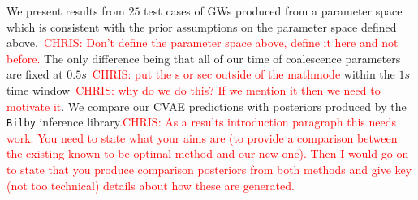 \documentclass[%
showpacs,
 amsmath,amssymb,
 aps,
 twocolumn,
 prl,
 reprint,
floatfix,
]{revtex4-1}
\newcommand{\chris}[1]{\textcolor{red}{CHRIS: #1}}
\begin{document}
%
%
We present results from $25$ test cases of \acp{GW} produced from a parameter space
which is consistent with the prior assumptions on the parameter space defined
above.~\chris{Don't define the parameter space above, define it here and not
before.} The only difference being that all of our time of coalescence
parameters are fixed at $0.5s$~\chris{put the s or sec outside of the mathmode}
within the $1s$ time window~\chris{why do we do this? If we mention it then we
need to motivate it}. We compare our \ac{CVAE} predictions with posteriors
produced by the \texttt{Bilby} inference library.\chris{As a results
introduction paragraph this needs work. You need to state what your aims are
(to provide a comparison between the existing known-to-be-optimal method and
our new one). Then I would go on to state that you produce comparison
posteriors from both methods and give key (not too technical) details about how
these are generated.}
\end{document}
